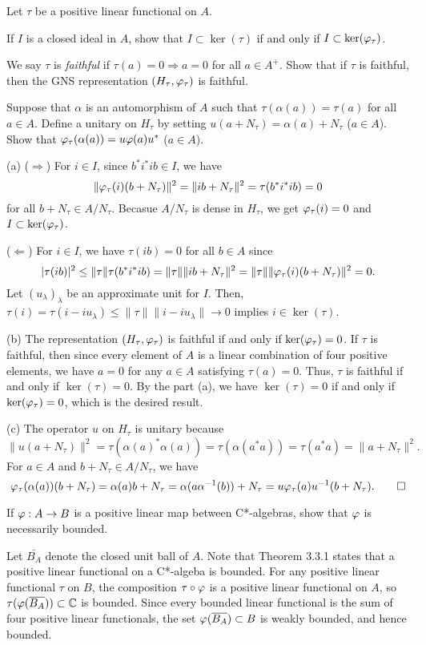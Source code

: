 \documentclass{../../small}
\begin{document}
\begin{prb}
Let $\tau$ be a positive linear functional on $A$.
\begin{parts}
\item
If $I$ is a closed ideal in $A$, show that $I\subset\ker(\tau)$ if and only if $I\subset\ker(\varphi_\tau)$.
\item
We say $\tau$ is \emph{faithful} if $\tau(a)=0\Rightarrow a=0$ for all $a\in A^+$.
Show that if $\tau$ is faithful, then the GNS representation $(H_\tau,\varphi_\tau)$ is faithful.
\item
Suppose that $\alpha$ is an automorphism of $A$ such that $\tau(\alpha(a))=\tau(a)$ for all $a\in A$.
Define a unitary on $H_\tau$ by setting $u(a+N_\tau)=\alpha(a)+N_\tau$ ($a\in A$).
Show that $\varphi_\tau(\alpha(a))=u\varphi(a)u^*$ ($a\in A$).
\end{parts}
\end{prb}
\begin{sol}
(a)
($\Rightarrow$)
For $i\in I$, since $b^*i^*ib\in I$, we have
\[\|\varphi_\tau(i)(b+N_\tau)\|^2=\|ib+N_\tau\|^2=\tau(b^*i^*ib)=0\]
for all $b+N_\tau\in A/N_\tau$.
Becasue $A/N_\tau$ is dense in $H_\tau$, we get $\varphi_\tau(i)=0$ and $I\subset\ker(\varphi_\tau)$.

($\Leftarrow$)
For $i\in I$, we have $\tau(ib)=0$ for all $b\in A$ since
\[|\tau(ib)|^2\le\|\tau\|\tau(b^*i^*ib)=\|\tau\|\|ib+N_\tau\|^2=\|\tau\|\|\varphi_\tau(i)(b+N_\tau)\|^2=0.\]
Let $(u_\lambda)_\lambda$ be an approximate unit for $I$.
Then, $\tau(i)=\tau(i-iu_\lambda)\le\|\tau\|\|i-iu_\lambda\|\to0$ implies $i\in\ker(\tau)$.

(b)
The representation $(H_\tau,\varphi_\tau)$ is faithful if and only if $\ker(\varphi_\tau)=0$.
If $\tau$ is faithful, then since every element of $A$ is a linear combination of four positive elements, we have $a=0$ for any $a\in A$ satisfying $\tau(a)=0$.
Thus, $\tau$ is faithful if and only if $\ker(\tau)=0$.
By the part (a), we have $\ker(\tau)=0$ if and only if $\ker(\varphi_\tau)=0$, which is the desired result.

(c)
The operator $u$ on $H_\tau$ is unitary because
\[\|u(a+N_\tau)\|^2=\tau(\alpha(a)^*\alpha(a))=\tau(\alpha(a^*a))=\tau(a^*a)=\|a+N_\tau\|^2.\]
For $a\in A$ and $b+N_\tau\in A/N_\tau$, we have
\[\varphi_\tau(\alpha(a))(b+N_\tau)=\alpha(a)b+N_\tau=\alpha(a\alpha^{-1}(b))+N_\tau=u\varphi_\tau(a)u^{-1}(b+N_\tau).\qedhere\]
\end{sol}


\begin{prb}
If $\varphi:A\to B$ is a positive linear map between C*-algebras, show that $\varphi$ is necessarily bounded.
\end{prb}
\begin{sol}
Let $\bar{B_A}$ denote the closed unit ball of $A$.
Note that Theorem 3.3.1 states that a positive linear functional on a C*-algeba is bounded.
For any positive linear functional $\tau$ on $B$, the composition $\tau\circ\varphi$ is a positive linear functional on $A$, so $\tau(\varphi(\overline{B_A}))\subset\mathbb{C}$ is bounded.
Since every bounded linear functional is the sum of four positive linear functionals, the set $\varphi(\overline{B_A})\subset B$ is weakly bounded, and hence bounded.
\end{sol}
\end{document}
